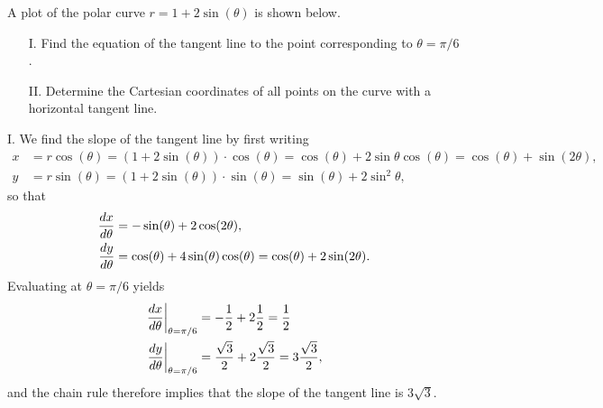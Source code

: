 \documentclass[noauthor,handout]{ximera}
\begin{document}
\begin{problem}
A plot of the polar curve $r=1+2\sin(\theta)$ is shown below.
\begin{image}  
\end{image} 

\begin{itemize}
\item[I.] Find the equation of the tangent line to the point corresponding to $\theta = \pi/6$.
\item[II.]  Determine the Cartesian coordinates of all points on the curve with a horizontal tangent line.
\end{itemize}
\begin{freeResponse}
I. We find the slope of the tangent line by first writing
\begin{align*}
x &= r \cos(\theta) = (1+ 2 \sin(\theta)) \cdot \cos(\theta) = \cos(\theta) + 2 \sin\theta \cos(\theta) = \cos(\theta) + \sin (2\theta), \\
y&= r \sin(\theta) = (1+ 2 \sin(\theta)) \cdot \sin(\theta) = \sin(\theta) + 2 \sin^2 \theta,
\end{align*}
so that
\begin{align*}
\frac{\mathop{}\!d x}{\mathop{}\!d \theta} &= -\sin(\theta) + 2 \cos(2 \theta), \\
\frac{\mathop{}\!d y}{\mathop{}\!d \theta} &= \cos(\theta) + 4 \sin(\theta) \cos(\theta) = \cos(\theta) + 2 \sin(2 \theta).
\end{align*}
Evaluating at $\theta = \pi/6$ yields 
\begin{align*}
\left.\frac{\mathop{}\!d x}{\mathop{}\!d \theta}\right|_{\theta = \pi/6} &= -\frac{1}{2} +  2 \frac{1}{2} = \frac{1}{2} \\
\left.\frac{\mathop{}\!d y}{\mathop{}\!d \theta}\right|_{\theta = \pi/6} &= \frac{\sqrt{3}}{2} + 2 \frac{\sqrt{3}}{2} = 3 \frac{\sqrt{3}}{2},
\end{align*}
and the chain rule therefore implies that the slope of the tangent line is $3 \sqrt{3}$.


\end{freeResponse}
\end{problem}
\end{document}
